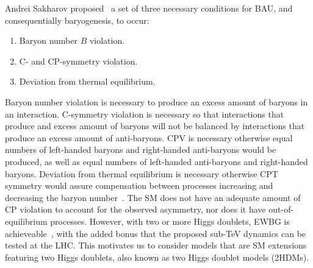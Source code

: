 Andrei Sakharov proposed~\cite{Sakharov1967BAU} a set of three necessary conditions for BAU, and consequentially baryogenesis, to occur:
\begin{enumerate}
  \item Baryon number \(B \) violation.
  \item C- and CP-symmetry violation.
  \item Deviation from thermal equilibrium.
\end{enumerate}
Baryon number violation is necessary to produce an excess amount of baryons in an interaction.
C-symmetry violation is necessary so that interactions that produce and excess amount of baryons will not be balanced by interactions that produce an excess amount of anti-baryons.
CPV is necessary otherwise equal numbers of left-handed baryons and right-handed anti-baryons would be produced, as well as equal numbers of left-handed anti-baryons and right-handed baryons.
Deviation from thermal equilibrium is necessary otherwise CPT symmetry would assure compensation between processes increasing and decreasing the baryon number~\cite{ShaposhnikovFarrar1993BAU}.
The SM does not have an adequate amount of CP violation to account for the observed asymmetry, nor does it have out-of-equilibrium processes.
However, with two or more Higgs doublets, EWBG is achieveable~\cite{Bochkarev1990EWBG2HDM}, with the added bonus that the proposed sub-TeV dynamics can be tested at the LHC.
This motivates us to consider models that are SM extensions featuring two Higgs doublets, also known as two Higgs doublet models (2HDMs).